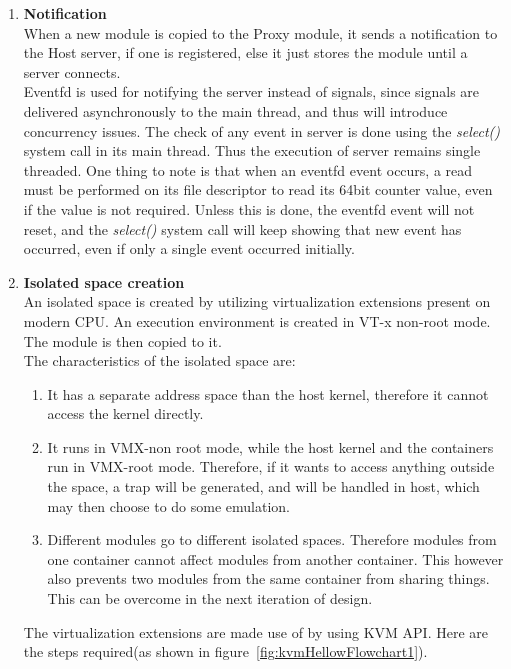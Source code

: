 \documentclass[twoside]{iitbreport}
\begin{document}
\begin{enumerate}
\item \textbf{Notification}\\
When a new module is copied to the Proxy module, it sends a notification to the Host server, if one is registered, else it just stores the module until a server connects.\\
Eventfd is used for notifying the server instead of signals, since signals are delivered asynchronously to the main thread, and thus will introduce concurrency issues. The check of any event in server is done using the \textit{select()} system call in its main thread. Thus the execution of server remains single threaded. One thing to note is that when an eventfd event occurs, a read must be performed on its file descriptor to read its 64bit counter value, even if the value is not required. Unless this is done, the eventfd event will not reset, and the \textit{select()} system call will keep showing that new event has occurred, even if only a single event occurred initially.

\item \textbf{Isolated space creation}\\
An isolated space is created by utilizing virtualization extensions present on modern CPU. An execution environment is created in VT-x non-root mode. The module is then copied to it.\\
The characteristics of the isolated space are:\\
\begin{enumerate}
\item It has a separate address space than the host kernel, therefore it cannot access the kernel directly.
\item It runs in VMX-non root mode, while the host kernel and the containers run in VMX-root mode. Therefore, if it wants to access anything outside the space, a trap will be generated, and will be handled in host, which may then choose to do some emulation.
\item Different modules go to different isolated spaces. Therefore modules from one container cannot affect modules from another container. This however also prevents two modules from the same container from sharing things. This can be overcome in the next iteration of design.
\end{enumerate}

The virtualization extensions are made use of by using KVM API\cite{kvmApiDoc}. Here are the steps required(as shown in figure~\ref{fig:kvmHellowFlowchart1}).


\end{enumerate}
\end{document}

